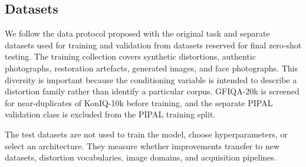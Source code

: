 \documentclass{article}
\begin{document}
\subsection{Datasets}

We follow the data protocol proposed with the original task and separate datasets used for training and validation from datasets reserved for final zero-shot testing. The training collection covers synthetic distortions, authentic photographs, restoration artefacts, generated images, and face photographs. This diversity is important because the conditioning variable is intended to describe a distortion family rather than identify a particular corpus. GFIQA-20k is screened for near-duplicates of KonIQ-10k before training, and the separate PIPAL validation class is excluded from the PIPAL training split.

\begin{table}[htbp]
\centering
\small
\setlength{\tabcolsep}{4pt}
\caption{Datasets available for training and in-domain validation.}
\label{tab:training-datasets}
\end{table}

The test datasets are not used to train the model, choose hyperparameters, or select an architecture. They measure whether improvements transfer to new datasets, distortion vocabularies, image domains, and acquisition pipelines.
\end{document}
